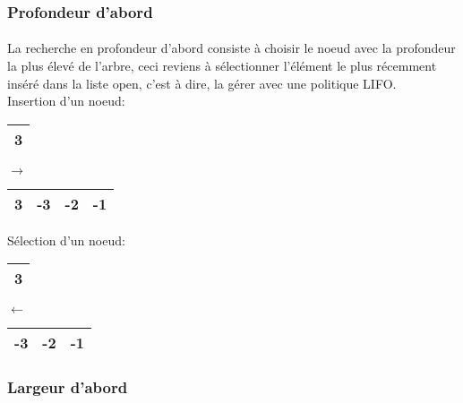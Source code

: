 \subsubsection{Profondeur d'abord}
\paragraph{}
La recherche en profondeur d’abord consiste à choisir le noeud avec la profondeur la plus élevé de l’arbre, ceci reviens à sélectionner l’élément le plus récemment inséré dans la liste open, c’est à dire, la gérer avec une politique LIFO.\\
Insertion d'un noeud:\\
\begin{minipage}{0.5\textwidth}
	\centering
	\begin{tabular}{|c |}
		\hline
		 3 \\
		\hline
	\end{tabular}
\end{minipage}
\hfillx
$\rightarrow$
\begin{minipage}{0.5\textwidth}
	\centering
	\begin{tabular}{|c | c| c| c|}
		\hline
		{\color{red}3} & -3 & -2 & -1 \\\hline
	\end{tabular}
\end{minipage}

Sélection d'un noeud:\\
\begin{minipage}{0.5\textwidth}
	\centering
	\begin{tabular}{|c |}
		\hline
		{\color{red}3} \\
		\hline
	\end{tabular}
\end{minipage}
\hfillx
$\leftarrow$
\begin{minipage}{0.5\textwidth}
	\centering
	\begin{tabular}{| c| c| c|}
		\hline
		-3 & -2 & -1 \\\hline
	\end{tabular}
\end{minipage}


\subsubsection{Largeur d'abord}
